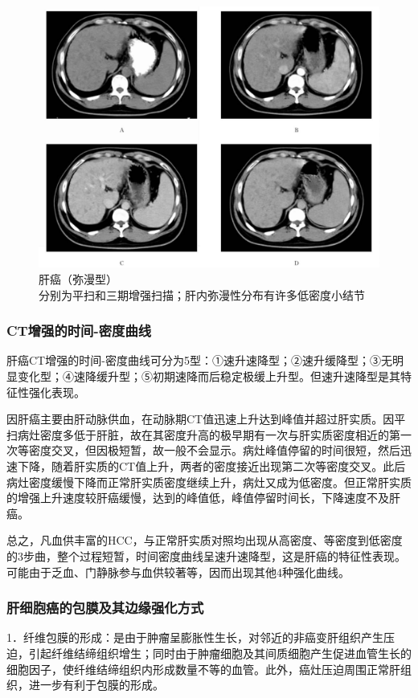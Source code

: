 \begin{figure}[!htbp]
 \centering
 \includegraphics[width=.7\textwidth,height=\textheight,keepaspectratio]{./images/Image00273.jpg}
 \captionsetup{justification=centering}
 \caption{肝癌（弥漫型）\\{\small 分别为平扫和三期增强扫描；肝内弥漫性分布有许多低密度小结节}}
 \label{fig11-2}
  \end{figure} 

\subsubsection{CT增强的时间-密度曲线}

肝癌CT增强的时间-密度曲线可分为5型：①速升速降型；②速升缓降型；③无明显变化型；④速降缓升型；⑤初期速降而后稳定极缓上升型。但速升速降型是其特征性强化表现。

因肝癌主要由肝动脉供血，在动脉期CT值迅速上升达到峰值并超过肝实质。因平扫病灶密度多低于肝脏，故在其密度升高的极早期有一次与肝实质密度相近的第一次等密度交叉，但因极短暂，故一般不会显示。病灶峰值停留的时间很短，然后迅速下降，随着肝实质的CT值上升，两者的密度接近出现第二次等密度交叉。此后病灶密度缓慢下降而正常肝实质密度继续上升，病灶又成为低密度。但正常肝实质的增强上升速度较肝癌缓慢，达到的峰值低，峰值停留时间长，下降速度不及肝癌。

总之，凡血供丰富的HCC，与正常肝实质对照均出现从高密度、等密度到低密度的3步曲，整个过程短暂，时间密度曲线呈速升速降型，这是肝癌的特征性表现。可能由于乏血、门静脉参与血供较著等，因而出现其他4种强化曲线。

\subsubsection{肝细胞癌的包膜及其边缘强化方式}

1．纤维包膜的形成：是由于肿瘤呈膨胀性生长，对邻近的非癌变肝组织产生压迫，引起纤维结缔组织增生；同时由于肿瘤细胞及其间质细胞产生促进血管生长的细胞因子，使纤维结缔组织内形成数量不等的血管。此外，癌灶压迫周围正常肝组织，进一步有利于包膜的形成。

